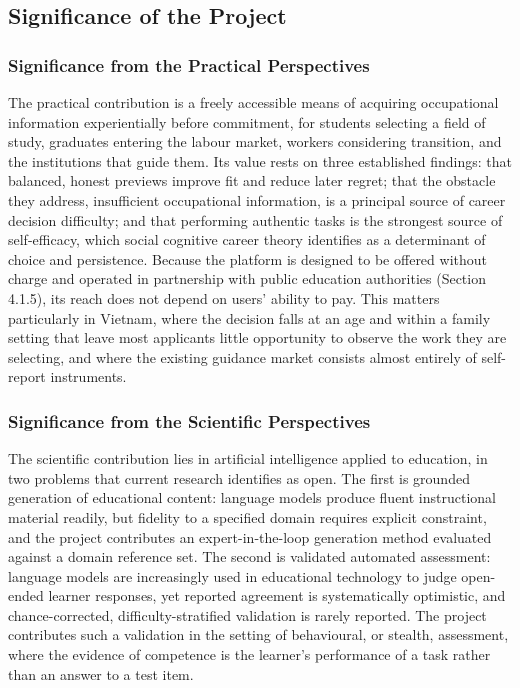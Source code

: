 \subsection{Significance of the Project}

\subsubsection{Significance from the Practical Perspectives}

The practical contribution is a freely accessible means of acquiring occupational information experientially before commitment, for students selecting a field of study, graduates entering the labour market, workers considering transition, and the institutions that guide them. Its value rests on three established findings: that balanced, honest previews improve fit and reduce later regret\cite{r8,r9}; that the obstacle they address, insufficient occupational information, is a principal source of career decision difficulty\cite{r1,r2}; and that performing authentic tasks is the strongest source of self-efficacy, which social cognitive career theory identifies as a determinant of choice and persistence\cite{r10,r11}. Because the platform is designed to be offered without charge and operated in partnership with public education authorities (Section 4.1.5), its reach does not depend on users' ability to pay. This matters particularly in Vietnam, where the decision falls at an age and within a family setting that leave most applicants little opportunity to observe the work they are selecting, and where the existing guidance market consists almost entirely of self-report instruments.

\subsubsection{Significance from the Scientific Perspectives}

The scientific contribution lies in artificial intelligence applied to education, in two problems that current research identifies as open. The first is grounded generation of educational content: language models produce fluent instructional material readily, but fidelity to a specified domain requires explicit constraint, and the project contributes an expert-in-the-loop generation method evaluated against a domain reference set. The second is validated automated assessment: language models are increasingly used in educational technology to judge open-ended learner responses, yet reported agreement is systematically optimistic, and chance-corrected, difficulty-stratified validation is rarely reported. The project contributes such a validation in the setting of behavioural, or stealth, assessment, where the evidence of competence is the learner's performance of a task rather than an answer to a test item.

